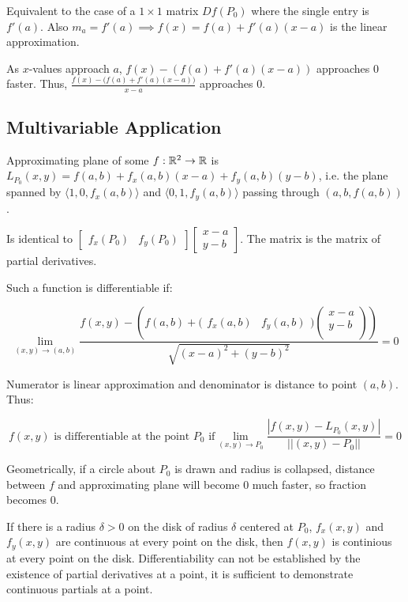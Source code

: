Equivalent to the case of a $1\times 1$ matrix $Df(P_0)$ where the single entry is $f'(a)$.
Also $m_a=f'(a)\implies f(x)=f(a)+f'(a)(x-a)$ is the linear approximation. 

As $x$-values approach $a$, $f(x)-(f(a)+f'(a)(x-a))$ approaches 0 faster. Thus, $\frac{f(x)-\big(f(a)+f'(a)(x-a)\big)}{x-a}$ approaches 0.

\subsection{Multivariable Application}

Approximating plane of some $f:\mathbb{R}^2\to \mathbb{R}$ is $L_{P_0}(x,y)=f(a,b)+f_x(a,b)(x-a)+f_y(a,b)(y-b)$, i.e. the plane spanned by
$\langle 1,0,f_x(a,b)\rangle$ and $\langle 0,1,f_y(a,b)\rangle$ passing through $(a,b,f(a,b))$.

Is identical to $\begin{bmatrix}f_x(P_0)&f_y(P_0)\end{bmatrix}\begin{bmatrix}x-a\\y-b\end{bmatrix}$. The matrix is the matrix of partial derivatives.

Such a function is differentiable if:

\[\displaystyle \lim_{(x,y)\to(a,b)}\frac{f(x,y)-\left(f(a,b)+\Big(\begin{matrix} f_x(a,b)&f_y(a,b) \end{matrix} \Big)\left(\begin{matrix}x-a\\y-b\\ \end{matrix} \right) \right)}{\sqrt{(x-a)^2+(y-b)^2}}=0\]

Numerator is linear approximation and denominator is distance to point $(a,b)$. Thus:

\[\boxed{f(x,y) \mbox{ is differentiable at the point }P_0\mbox{ if}\displaystyle \lim_{(x,y)\to P_0}\frac{|f(x,y)-L_{P_0}(x,y)|}{||(x,y)-P_0||}=0}\]

Geometrically, if a circle about $P_0$ is drawn and radius is collapsed, distance between $f$ and approximating plane will become 0 much faster, so fraction becomes 0.

If there is a radius $\delta > 0$ on the disk of radius $\delta$ centered at $P_0$, $f_x(x,y)$ and $f_y(x,y)$ are continuous at every point on the disk, then $f(x,y)$ is continious at every point on the disk.
Differentiability can not be established by the existence of partial derivatives at a point, it is sufficient to demonstrate continuous partials
at a point.

